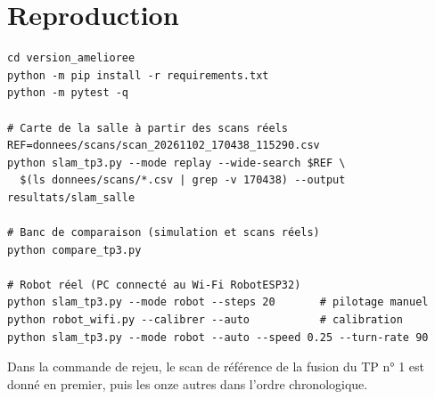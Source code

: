 \documentclass[11pt,a4paper]{article}
\begin{document}
\section{Reproduction}
\begin{lstlisting}
cd version_amelioree
python -m pip install -r requirements.txt
python -m pytest -q

# Carte de la salle à partir des scans réels
REF=donnees/scans/scan_20261102_170438_115290.csv
python slam_tp3.py --mode replay --wide-search $REF \
  $(ls donnees/scans/*.csv | grep -v 170438) --output resultats/slam_salle

# Banc de comparaison (simulation et scans réels)
python compare_tp3.py

# Robot réel (PC connecté au Wi-Fi RobotESP32)
python slam_tp3.py --mode robot --steps 20       # pilotage manuel
python robot_wifi.py --calibrer --auto           # calibration
python slam_tp3.py --mode robot --auto --speed 0.25 --turn-rate 90
\end{lstlisting}
Dans la commande de rejeu, le scan de référence de la fusion du TP n° 1 est
donné en premier, puis les onze autres dans l'ordre chronologique.
\end{document}
